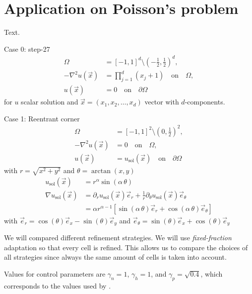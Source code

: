 \chapter{Application on Poisson's problem}
\label{ch:results}
Text.

Case 0: step-27
\begin{align}
  \Omega &= [-1,1]^d \setminus \left(-\frac{1}{2}, \frac{1}{2}\right)^d ,\\
  - \nabla^2 u(\vec{x}) &= \prod\limits_{j=1}^{d} (x_j + 1) \quad\text{on}\quad \Omega,\\
  u(\vec{x}) &= 0 \quad\text{on}\quad \partial\Omega
\end{align}
for $u$ scalar solution and $\vec{x} = (x_1, x_2, \dots, x_d)$ vector with $d$-components.


Case 1: Reentrant corner
\begin{align}
  \Omega &= [-1,1]^2 \setminus (0,\frac{1}{2})^2 ,\\
  - \nabla^2 u(\vec{x}) &= 0 \quad\text{on}\quad \Omega,\\
  u(\vec{x}) &= u_\text{sol}(\vec{x}) \quad\text{on}\quad \partial\Omega
\end{align}
with \(r = \sqrt{x^2 + y^2}\) and \(\theta = \arctan(x,y) \)
\begin{align}
  u_\text{sol}(\vec{x}) &= r^\alpha \sin(\alpha \, \theta) \\
  \nabla u_\text{sol}(\vec{x}) &= \partial_r u_\text{sol}(\vec{x}) \vec{e}_r + \frac{1}{r} \partial_\theta u_\text{sol}(\vec{x}) \vec{e}_\theta \\
  &= \alpha r^{\alpha - 1} \left[ \sin(\alpha \, \theta) \vec{e}_r + \cos(\alpha \, \theta) \vec{e}_\theta \right]
\end{align}
with \(\vec{e}_r = \cos(\theta) \vec{e}_x - \sin(\theta) \vec{e}_y\) and \(\vec{e}_\theta = \sin(\theta) \vec{e}_x + \cos(\theta) \vec{e}_y\)


We will compared different refinement strategies. We will use \textit{fixed-fraction} adaptation so that every cell is refined. This allows us to compare the choices of all strategies since always the same amount of cells is taken into account. 

Values for control parameters are $\gamma_n = 1$, $\gamma_h = 1$, and $\gamma_p = \sqrt{0.4}$, which corresponds to the values used by \textcites{melenk2001}{mitchell2014}.




